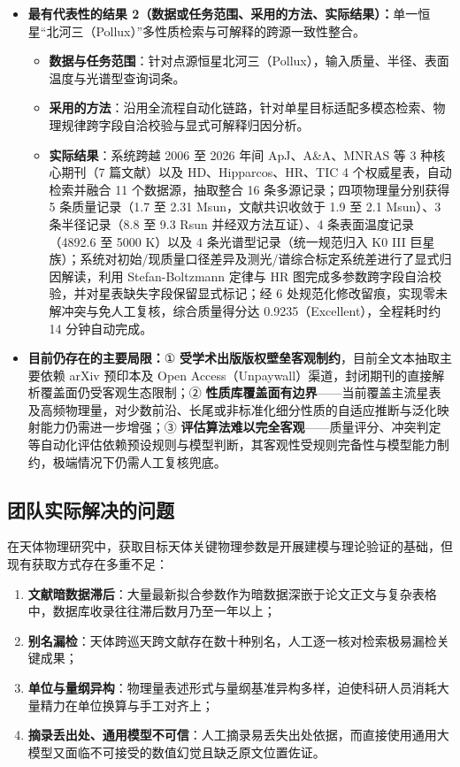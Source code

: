 \begin{itemize}[leftmargin=1.2em,itemsep=2pt]
\item \textbf{最有代表性的结果 2（数据或任务范围、采用的方法、实际结果）：}单一恒星“北河三（Pollux）”多性质检索与可解释的跨源一致性整合。
\begin{itemize}[leftmargin=1.2em,itemsep=1pt]
\item \textbf{数据与任务范围}：针对点源恒星北河三（Pollux），输入质量、半径、表面温度与光谱型查询词条。
\item \textbf{采用的方法}：沿用全流程自动化链路，针对单星目标适配多模态检索、物理规律跨字段自洽校验与显式可解释归因分析。
\item \textbf{实际结果}：系统跨越 2006 至 2026 年间 ApJ、A\&A、MNRAS 等 3 种核心期刊（7 篇文献）以及 HD、Hipparcos、HR、TIC 4 个权威星表，自动检索并融合 11 个数据源，抽取整合 16 条多源记录；四项物理量分别获得 5 条质量记录（1.7 至 2.31 Msun，文献共识收敛于 1.9 至 2.1 Msun）、3 条半径记录（8.8 至 9.3 Rsun 并经双方法互证）、4 条表面温度记录（4892.6 至 5000 K）以及 4 条光谱型记录（统一规范归入 K0 III 巨星族）；系统对初始/现质量口径差异及测光/谱综合标定系统差进行了显式归因解读，利用 Stefan-Boltzmann 定律与 HR 图完成多参数跨字段自洽校验，并对星表缺失字段保留显式标记；经 6 处规范化修改留痕，实现零未解冲突与免人工复核，综合质量得分达 0.9235（Excellent），全程耗时约 14 分钟自动完成。
\end{itemize}
\item \textbf{目前仍存在的主要局限：}① \textbf{受学术出版版权壁垒客观制约}，目前全文本抽取主要依赖 arXiv 预印本及 Open Access（Unpaywall）渠道，封闭期刊的直接解析覆盖面仍受客观生态限制；② \textbf{性质库覆盖面有边界}——当前覆盖主流星表及高频物理量，对少数前沿、长尾或非标准化细分性质的自适应推断与泛化映射能力仍需进一步增强；③ \textbf{评估算法难以完全客观}——质量评分、冲突判定等自动化评估依赖预设规则与模型判断，其客观性受规则完备性与模型能力制约，极端情况下仍需人工复核兜底。
\end{itemize}

\subsection{团队实际解决的问题}

在天体物理研究中，获取目标天体关键物理参数是开展建模与理论验证的基础，但现有获取方式存在多重不足：

\renewcommand{\labelenumi}{\arabic{enumi}．}
\begin{enumerate}[leftmargin=1.6em,itemsep=2pt]
\item \textbf{文献暗数据滞后}：大量最新拟合参数作为暗数据深嵌于论文正文与复杂表格中，数据库收录往往滞后数月乃至一年以上；
\item \textbf{别名漏检}：天体跨巡天跨文献存在数十种别名，人工逐一核对检索极易漏检关键成果；
\item \textbf{单位与量纲异构}：物理量表述形式与量纲基准异构多样，迫使科研人员消耗大量精力在单位换算与手工对齐上；
\item \textbf{摘录丢出处、通用模型不可信}：人工摘录易丢失出处依据，而直接使用通用大模型又面临不可接受的数值幻觉且缺乏原文位置佐证。
\end{enumerate}

